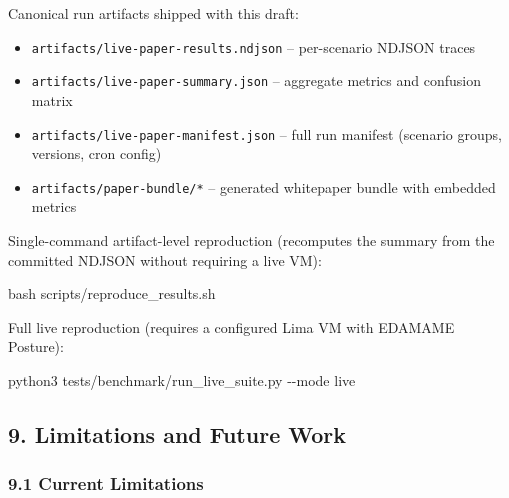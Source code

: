 \documentclass[
]{article}
\newenvironment{Shaded}{}{}
\newcommand{\AttributeTok}[1]{\textcolor[rgb]{0.49,0.56,0.16}{#1}}
\newcommand{\ExtensionTok}[1]{#1}
\newcommand{\FunctionTok}[1]{\textcolor[rgb]{0.02,0.16,0.49}{#1}}
\newcommand{\NormalTok}[1]{#1}
\providecommand{\tightlist}{%
  \setlength{\itemsep}{0pt}\setlength{\parskip}{0pt}}
\begin{document}
Canonical run artifacts shipped with this draft:

\begin{itemize}
\tightlist
\item
  \texttt{artifacts/live-paper-results.ndjson} -- per-scenario NDJSON
  traces
\item
  \texttt{artifacts/live-paper-summary.json} -- aggregate metrics and
  confusion matrix
\item
  \texttt{artifacts/live-paper-manifest.json} -- full run manifest
  (scenario groups, versions, cron config)
\item
  \texttt{artifacts/paper-bundle/*} -- generated whitepaper bundle with
  embedded metrics
\end{itemize}

Single-command artifact-level reproduction (recomputes the summary from
the committed NDJSON without requiring a live VM):

\begin{Shaded}
\begin{Highlighting}[]
\FunctionTok{bash}\NormalTok{ scripts/reproduce\_results.sh}
\end{Highlighting}
\end{Shaded}

Full live reproduction (requires a configured Lima VM with EDAMAME
Posture):

\begin{Shaded}
\begin{Highlighting}[]
\ExtensionTok{python3}\NormalTok{ tests/benchmark/run\_live\_suite.py }\AttributeTok{{-}{-}mode}\NormalTok{ live}
\end{Highlighting}
\end{Shaded}

\subsection{9. Limitations and Future
Work}\label{limitations-and-future-work}

\subsubsection{9.1 Current Limitations}\label{current-limitations}
\end{document}
